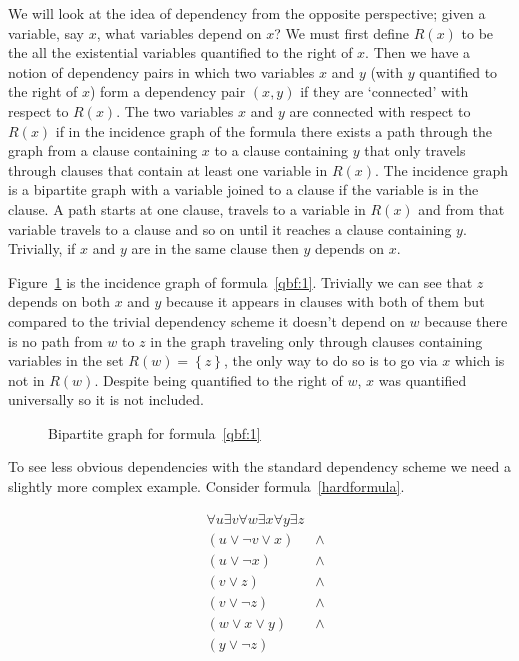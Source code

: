 We will look at the idea of dependency from the opposite perspective; given a variable, say $x$, what variables depend on $x$? We must first define $R(x)$ to be the all the existential variables quantified to the right of $x$. Then we have a notion of dependency pairs in which two variables $x$ and $y$ (with $y$ quantified to the right of $x$) form a dependency pair $(x,y)$ if they are `connected' with respect to $R(x)$. The two variables $x$ and $y$ are connected with respect to $R(x)$ if in the incidence graph of the formula there exists a path through the graph from a clause containing $x$ to a clause containing $y$ that only travels through clauses that contain at least one variable in $R(x)$. The incidence graph is a bipartite graph with a variable joined to a clause if the variable is in the clause. A path starts at one clause, travels to a variable in $R(x)$ and from that variable travels to a clause and so on until it reaches a clause containing $y$. Trivially, if $x$ and $y$ are in the same clause then $y$ depends on $x$.

Figure~\ref{bigrapheasy} is the incidence graph of formula~\ref{qbf:1}. Trivially we can see that $z$ depends on both $x$ and $y$ because it appears in clauses with both of them but compared to the trivial dependency scheme it doesn't depend on $w$ because there is no path from $w$ to $z$ in the graph traveling only through clauses containing variables in the set $R(w)=\left \{z\right \}$, the only way to do so is to go via $x$ which is not in $R(w)$. Despite being quantified to the right of $w$, $x$ was quantified universally so it is not included.

\begin{figure}[H]
\begin{CenteredBox}

\end{CenteredBox}
\caption{Bipartite graph for formula~\ref{qbf:1}}
\label{bigrapheasy}
\end{figure}

To see less obvious dependencies with the standard dependency scheme we need a slightly more complex example. Consider formula~\ref{hardformula}.

\begin{equation}
\label{hardformula}
\begin{aligned}
&\forall u \exists v \forall w \exists x \forall y \exists z\\
&(u \lor \neg v \lor x) &\land\\
&(u \lor \neg x) &\land\\
&(v \lor z) &\land\\
&(v \lor \neg z) &\land\\
&(w \lor x \lor y) &\land\\
&(y \lor \neg z)\\
\end{aligned}
\end{equation}

